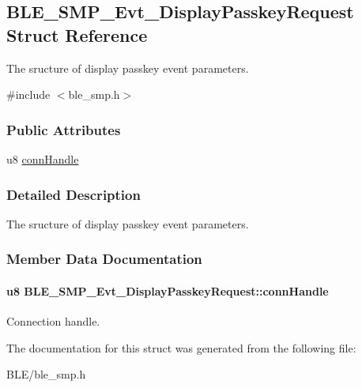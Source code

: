 \hypertarget{struct_b_l_e___s_m_p___evt___display_passkey_request}{}\subsection{B\+L\+E\+\_\+\+S\+M\+P\+\_\+\+Evt\+\_\+\+Display\+Passkey\+Request Struct Reference}
\label{struct_b_l_e___s_m_p___evt___display_passkey_request}


The sructure of display passkey event parameters.  




{\ttfamily \#include $<$ble\+\_\+smp.\+h$>$}

\subsubsection*{Public Attributes}
\begin{DoxyCompactItemize}
\item 
u8 \hyperlink{struct_b_l_e___s_m_p___evt___display_passkey_request_a20c3d6c7f00ca7759078c60a80bb269f}{conn\+Handle}
\end{DoxyCompactItemize}


\subsubsection{Detailed Description}
The sructure of display passkey event parameters. 

\subsubsection{Member Data Documentation}
\paragraph[{\texorpdfstring{conn\+Handle}{connHandle}}]{\setlength{\rightskip}{0pt plus 5cm}u8 B\+L\+E\+\_\+\+S\+M\+P\+\_\+\+Evt\+\_\+\+Display\+Passkey\+Request\+::conn\+Handle}\hypertarget{struct_b_l_e___s_m_p___evt___display_passkey_request_a20c3d6c7f00ca7759078c60a80bb269f}{}\label{struct_b_l_e___s_m_p___evt___display_passkey_request_a20c3d6c7f00ca7759078c60a80bb269f}
Connection handle. 

The documentation for this struct was generated from the following file\+:\begin{DoxyCompactItemize}
\item 
B\+L\+E/ble\+\_\+smp.\+h\end{DoxyCompactItemize}
